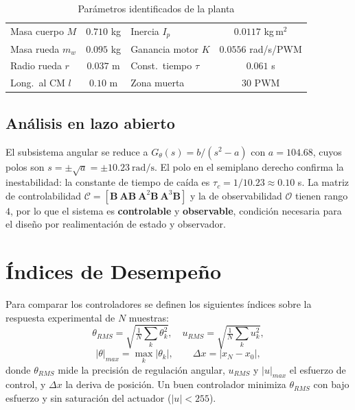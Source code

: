 \documentclass[conference]{IEEEtran}
\newcommand{\mat}[1]{\mathbf{#1}}
\begin{document}
\begin{table}[htbp]
\caption{Par\'ametros identificados de la planta}
\label{tab:ident}
\begin{center}\footnotesize
\begin{tabular}{|l|c||l|c|}
\hline
Masa cuerpo $M$ & $0.710$ kg & Inercia $I_p$ & $0.0117$ kg\,m$^2$ \\
Masa rueda $m_w$ & $0.095$ kg & Ganancia motor $K$ & $0.0556$ rad/s/PWM \\
Radio rueda $r$ & $0.037$ m & Const.\ tiempo $\tau$ & $0.061$ s \\
Long.\ al CM $l$ & $0.10$ m & Zona muerta & $30$ PWM \\
\hline
\end{tabular}
\end{center}
\end{table}

\subsection{An\'alisis en lazo abierto}
El subsistema angular se reduce a
$G_\theta(s)=b/(s^2-a)$ con $a=104.68$, cuyos polos son
$s=\pm\sqrt{a}=\pm10.23~\mathrm{rad/s}$. El polo en el semiplano derecho confirma la
inestabilidad: la constante de tiempo de ca\'ida es $\tau_c=1/10.23\approx0.10$ s.
La matriz de controlabilidad $\mathcal{C}=[\mat{B}\ \mat{A}\mat{B}\ \mat{A}^2\mat{B}\ \mat{A}^3\mat{B}]$
y la de observabilidad $\mathcal{O}$ tienen rango $4$, por lo que el sistema es
\textbf{controlable} y \textbf{observable}, condici\'on necesaria para el dise\~no
por realimentaci\'on de estado y observador.

\section{\'Indices de Desempe\~no}
Para comparar los controladores se definen los siguientes \'indices sobre la
respuesta experimental de $N$ muestras:
\begin{equation}
\theta_{RMS}=\sqrt{\tfrac{1}{N}\textstyle\sum_{k}\theta_k^2},\quad
u_{RMS}=\sqrt{\tfrac{1}{N}\textstyle\sum_{k}u_k^2},
\end{equation}
\begin{equation}
|\theta|_{max}=\max_k|\theta_k|,\qquad
\Delta x=|x_N-x_0|,
\end{equation}
donde $\theta_{RMS}$ mide la precisi\'on de regulaci\'on angular, $u_{RMS}$ y
$|u|_{max}$ el esfuerzo de control, y $\Delta x$ la deriva de posici\'on. Un buen
controlador minimiza $\theta_{RMS}$ con bajo esfuerzo y sin saturaci\'on del
actuador ($|u|<255$).
\end{document}
